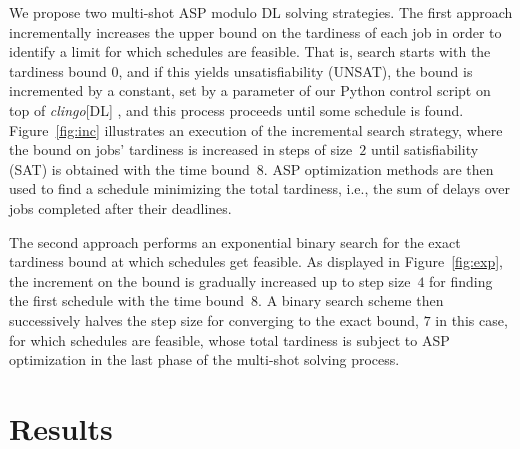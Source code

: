 \documentclass[submission,copyright,creativecommons]{eptcs}
\begin{document}
We propose two multi-shot ASP modulo DL solving strategies. The first approach incrementally increases the upper bound on the tardiness of each job in order to identify a limit for which schedules are feasible.
%
That is, search starts with the tardiness bound $0$, and if this yields unsatisfiability (UNSAT), the bound is incremented by a constant, 
set by a parameter of our Python control script on top of
\emph{clingo}[DL] \cite{DBLP:journals/tplp/JanhunenKOSWS17},
and this process proceeds until some schedule is found.
%
Figure~\ref{fig:inc} illustrates an execution of the incremental search strategy, where the bound on jobs' tardiness is increased in steps of size~$2$ until satisfiability (SAT)
is obtained with the time bound~$8$.
ASP optimization methods are then used to find a schedule minimizing the total tardiness, i.e., the
sum of delays over jobs completed after their deadlines.

The second approach performs an exponential binary search for the exact tardiness bound
at which schedules get feasible.
As displayed in Figure~\ref{fig:exp},
the increment on the bound is gradually increased up to step size~$4$ for finding the
first schedule with the time bound~$8$.
A binary search scheme then successively halves the step size for converging to
the exact bound, $7$ in this case, for which schedules are feasible, whose total
tardiness is subject to ASP optimization in the last phase of the multi-shot solving process.

\section{Results}
\end{document}
